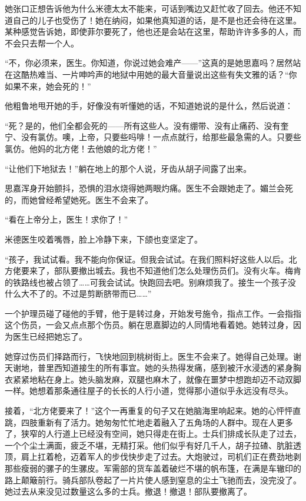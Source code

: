 \par 她张口正想告诉他为什么米德太太不能来，可话到嘴边又赶忙收了回去。他还不知道自己的儿子也受伤了！她在纳闷，如果他真知道的话，是不是也还会待在这里。某种感觉告诉她，即使菲尔要死了，他也还是会站在这里，帮助许许多多的人，而不会只去帮一个人。
\par “不，你必须来，医生。你知道，你说过她会难产——”这真的是她思嘉吗？居然站在这酷热难当、一片呻吟声的地狱中用她的最大音量说出这些有失文雅的话？“你如果不来，她会死的！”
\par 他粗鲁地甩开她的手，好像没有听懂她的话，不知道她说的是什么，然后说道：
\par “死？是的，他们全都会死的——所有这些人。没有绷带、没有止痛药、没有奎宁、没有氯仿。噢，上帝，只要些吗啡！一点点就行，给那些最急需的人。只要些氯仿。他妈的北方佬！去他娘的北方佬！”
\par “让他们下地狱去！”躺在地上的那个人说，牙齿从胡子间露了出来。
\par 思嘉浑身开始颤抖，恐惧的泪水烧得她两眼灼痛。医生不会跟她走了。媚兰会死的，而她曾经希望她死。医生不会来了。
\par “看在上帝分上，医生！求你了！”
\par 米德医生咬着嘴唇，脸上冷静下来，下颌也变坚定了。
\par “孩子，我试试看。我不能向你保证。但我会试试。在我们照料好这些人以后。北方佬要来了，部队要撤出城去。我也不知道他们怎么处理伤员们。没有火车。梅肯的铁路线也被占领了……可我会试试。快跑回去吧。别麻烦我了。接生一个孩子没什么大不了的。不过是剪断脐带而已……”
\par 一个护理员碰了碰他的手臂，他于是转过身，开始发号施令，指点工作。一会指指这个伤员，一会又点点那个伤员。躺在思嘉脚边的人同情地看着她。她转过身，因为医生已经把她忘了。
\par 她穿过伤员们择路而行，飞快地回到桃树街上。医生不会来了。她得自己处理。谢天谢地，普里西知道接生的所有事宜。她的头热得发痛，感到被汗水浸透的紧身胸衣紧紧地粘在身上。她头脑发麻，双腿也麻木了，就像在噩梦中想跑却迈不动双脚一样。她想着那条通往屋子的长长的人行小道，觉得那小道似乎永远没有尽头。
\par 接着，“北方佬要来了！”这个一再重复的句子又在她脑海里响起来。她的心怦怦直跳，四肢重新有了活力。她匆匆忙忙地走着融入了五角场的人群中。现在人更多了，狭窄的人行道上已经没有空间，她只得走在街上。士兵们排成长队走了过去，一个个尘土满面，疲乏不堪，无精打采。他们似乎有好几千人，胡子拉碴、肮脏透顶，肩上扛着枪，迈着军人的步伐快步走了过去。大炮驶过，司机们正在费劲地剥那些瘦弱的骡子的生骡皮。军需部的货车盖着破烂不堪的帆布篷，在满是车辙印的路上颠簸前行。骑兵部队卷起了一片片使人感到窒息的尘土飞驰而去，没完没了。她过去从来没见过数量这么多的士兵。撤退！撤退！部队要撤离了。
